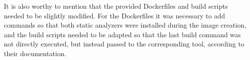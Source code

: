 It is also worthy to mention that the provided Dockerfiles and build scripts needed to be slightly modified. For the Dockerfiles it was necessary to add commands so that both static analyzers were installed during the image creation, and the build scripts needed to be adapted so that the last build command was not directly executed, but instead passed to the corresponding tool, according to their documentation. 